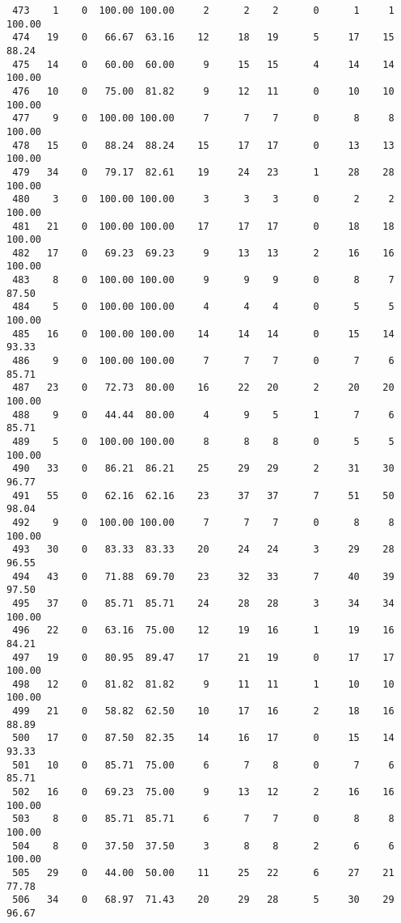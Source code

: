 \begin{verbatim}
 473    1    0  100.00 100.00     2      2    2      0      1     1   100.00
 474   19    0   66.67  63.16    12     18   19      5     17    15    88.24
 475   14    0   60.00  60.00     9     15   15      4     14    14   100.00
 476   10    0   75.00  81.82     9     12   11      0     10    10   100.00
 477    9    0  100.00 100.00     7      7    7      0      8     8   100.00
 478   15    0   88.24  88.24    15     17   17      0     13    13   100.00
 479   34    0   79.17  82.61    19     24   23      1     28    28   100.00
 480    3    0  100.00 100.00     3      3    3      0      2     2   100.00
 481   21    0  100.00 100.00    17     17   17      0     18    18   100.00
 482   17    0   69.23  69.23     9     13   13      2     16    16   100.00
 483    8    0  100.00 100.00     9      9    9      0      8     7    87.50
 484    5    0  100.00 100.00     4      4    4      0      5     5   100.00
 485   16    0  100.00 100.00    14     14   14      0     15    14    93.33
 486    9    0  100.00 100.00     7      7    7      0      7     6    85.71
 487   23    0   72.73  80.00    16     22   20      2     20    20   100.00
 488    9    0   44.44  80.00     4      9    5      1      7     6    85.71
 489    5    0  100.00 100.00     8      8    8      0      5     5   100.00
 490   33    0   86.21  86.21    25     29   29      2     31    30    96.77
 491   55    0   62.16  62.16    23     37   37      7     51    50    98.04
 492    9    0  100.00 100.00     7      7    7      0      8     8   100.00
 493   30    0   83.33  83.33    20     24   24      3     29    28    96.55
 494   43    0   71.88  69.70    23     32   33      7     40    39    97.50
 495   37    0   85.71  85.71    24     28   28      3     34    34   100.00
 496   22    0   63.16  75.00    12     19   16      1     19    16    84.21
 497   19    0   80.95  89.47    17     21   19      0     17    17   100.00
 498   12    0   81.82  81.82     9     11   11      1     10    10   100.00
 499   21    0   58.82  62.50    10     17   16      2     18    16    88.89
 500   17    0   87.50  82.35    14     16   17      0     15    14    93.33
 501   10    0   85.71  75.00     6      7    8      0      7     6    85.71
 502   16    0   69.23  75.00     9     13   12      2     16    16   100.00
 503    8    0   85.71  85.71     6      7    7      0      8     8   100.00
 504    8    0   37.50  37.50     3      8    8      2      6     6   100.00
 505   29    0   44.00  50.00    11     25   22      6     27    21    77.78
 506   34    0   68.97  71.43    20     29   28      5     30    29    96.67

\end{verbatim}
